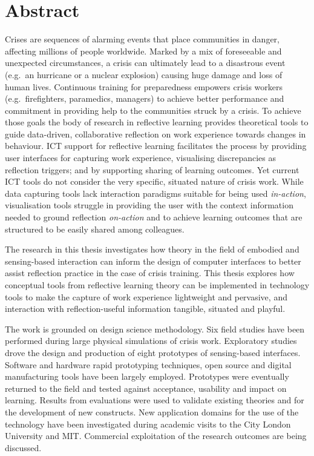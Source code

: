 \chapter{Abstract}

Crises are sequences of alarming events that place communities in danger, affecting millions of people worldwide. Marked by a mix of foreseeable and unexpected circumstances, a crisis can ultimately lead to a disastrous event (e.g.~an hurricane or a nuclear explosion) causing huge damage and loss of human lives. Continuous training for preparedness empowers crisis workers (e.g.~firefighters, paramedics, managers) to achieve better performance and commitment in providing help to the communities struck by a crisis. To achieve those goals the body of research in reflective learning provides theoretical tools to guide data-driven, collaborative reflection on work experience towards changes in behaviour. ICT support for reflective learning facilitates the process by providing user interfaces for capturing work experience, visualising discrepancies as reflection triggers; and by supporting sharing of learning outcomes. Yet current ICT tools do not consider the very specific, situated nature of crisis work. While data capturing tools lack interaction paradigms suitable for being used \emph{in-action}, visualisation tools struggle in providing the user with the context information needed to ground reflection \emph{on-action} and to achieve learning outcomes that are structured to be easily shared among colleagues.

The research in this thesis investigates how theory in the field of embodied and sensing-based interaction can inform the design of computer interfaces to better assist reflection practice in the case of crisis training. This thesis explores how conceptual tools from reflective learning theory can be implemented in technology tools to make the capture of work experience lightweight and pervasive, and interaction with reflection-useful information tangible, situated and playful.

The work is grounded on design science methodology. Six field studies have been performed during large physical simulations of crisis work. Exploratory studies drove the design and production of eight prototypes of sensing-based interfaces. Software and hardware rapid prototyping techniques, open source and digital manufacturing tools have been largely employed. Prototypes were eventually returned to the field and tested against acceptance, usability and impact on learning. Results from evaluations were used to validate existing theories and for the development of new constructs. New application domains for the use of the technology have been investigated during academic visits to the City London University and MIT. Commercial exploitation of the research outcomes are being discussed.

